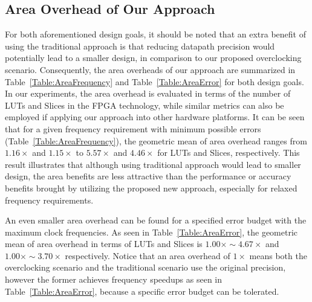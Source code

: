 \documentclass[prodmode,acmtrets]{acmsmall} %
\begin{document}
\subsection{Area Overhead of Our Approach}
For both aforementioned design goals, it should be noted that an extra benefit of using the traditional approach is that reducing datapath precision would potentially lead to a smaller design, in comparison to our proposed overclocking scenario. Consequently, the area overheads of our approach are summarized in Table~\ref{Table:AreaFrequency} and Table~\ref{Table:AreaError} for both design goals. In our experiments, the area overhead is evaluated in terms of the number of LUTs and Slices in the FPGA technology, while similar metrics can also be employed if applying our approach into other hardware platforms. It can be seen that for a given frequency requirement with minimum possible errors (Table~\ref{Table:AreaFrequency}), the geometric mean of area overhead ranges from $1.16\times$ and $1.15\times$ to $5.57\times$ and $4.46\times$ for LUTs and Slices, respectively. This result illustrates that although using traditional approach would lead to smaller design, the area benefits are less attractive than the performance or accuracy benefits brought by utilizing the proposed new approach, especially for relaxed frequency requirements.

An even smaller area overhead can be found for a specified error budget with the maximum clock frequencies. As seen in Table~\ref{Table:AreaError}, the geometric mean of area overhead in terms of LUTs and Slices is $1.00\times\sim4.67\times$ and $1.00\times\sim3.70\times$ respectively. Notice that an area overhead of $1\times$ means both the overclocking scenario and the traditional scenario use the original precision, however the former achieves frequency speedups as seen in Table~\ref{Table:AreaError}, because a specific error budget can be tolerated.
\end{document}
